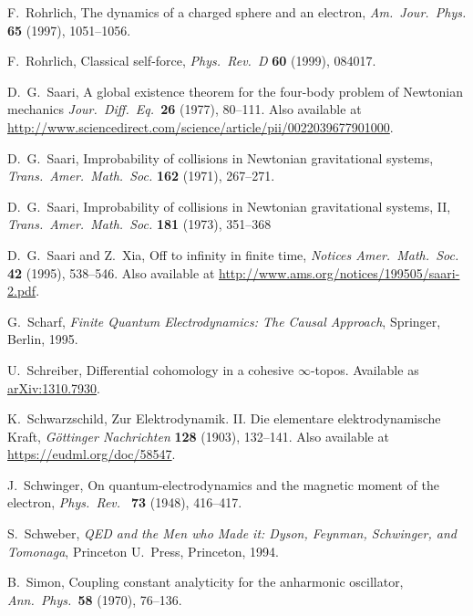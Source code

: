 \documentclass{article}
\begin{document}
\begin{thebibliography}{10}
 F.\ Rohrlich, The dynamics of a charged sphere and an electron,
\textsl{Am.\ Jour.\ Phys.} {\bf 65} (1997), 1051--1056.

 F.\ Rohrlich, Classical self-force, \textsl{Phys.\ Rev.\ D} {\bf 60} (1999), 084017.

 D.\ G.\ Saari, A global existence theorem for the four-body problem of Newtonian mechanics  \textsl{Jour.\ Diff.\ Eq.\ }{\bf 26} (1977), 80--111.  Also available
at \href{http://www.sciencedirect.com/science/article/pii/0022039677901000}{http://www.sciencedirect.com/science/article/pii/0022039677901000}.

 D.\ G.\ Saari,  Improbability of collisions in Newtonian gravitational systems, \textsl{Trans.\ Amer.\ Math.\ Soc.} \textbf{162} (1971), 267--271.

 D.\ G.\ Saari, Improbability of collisions in Newtonian gravitational systems, II, \textsl{Trans.\ Amer.\ Math.\ Soc.} \textbf{181} (1973), 351--368 

 D.\ G.\ Saari and Z.\ Xia, Off to infinity in finite time,
\textsl{Notices Amer.\ Math.\ Soc.} \textbf{42} (1995), 538--546.  Also available at 
\href{http://www.ams.org/notices/199505/saari-2.pdf}{http://www.ams.org/\break notices/199505/saari-2.pdf}.

 G.\ Scharf, \textsl{Finite Quantum Electrodynamics: The Causal Approach}, Springer, Berlin, 1995.  

 U.\ Schreiber, Differential cohomology in a cohesive $\infty$-topos.  Available as \href{http://arxiv.org/abs/1310.7930}{arXiv:1310.7930}. 

 K.\ Schwarzschild, Zur Elektrodynamik. II. Die elementare elektrodynamische Kraft, \textsl{G\"ottinger Nachrichten} \textbf{128} (1903), 132--141.  Also available at \href{https://eudml.org/doc/58547}{https://eudml.org/doc/58547}.

 J.\ Schwinger, On quantum-electrodynamics and the magnetic moment of the electron, \textsl{Phys.\ Rev.\ } \textbf{73} (1948), 416--417.  

 S.\ Schweber, \textsl{QED and the Men who Made it: Dyson, Feynman, Schwinger, and Tomonaga}, Princeton U.\ Press, Princeton, 1994.
 
 B.\ Simon, Coupling constant analyticity for the anharmonic oscillator, \textsl{Ann.\ Phys.\ }\textbf{58} (1970), 76--136. 


\end{thebibliography}
\end{document}
